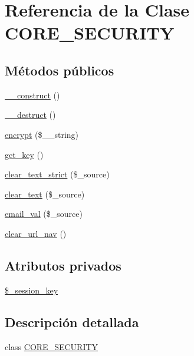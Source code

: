 \hypertarget{classCORE__SECURITY}{\section{Referencia de la Clase C\-O\-R\-E\-\_\-\-S\-E\-C\-U\-R\-I\-T\-Y}
\label{classCORE__SECURITY}
}
\subsection*{Métodos públicos}
\begin{DoxyCompactItemize}
\item 
\hyperlink{classCORE__SECURITY_a095c5d389db211932136b53f25f39685}{\-\_\-\-\_\-construct} ()
\item 
\hyperlink{classCORE__SECURITY_a421831a265621325e1fdd19aace0c758}{\-\_\-\-\_\-destruct} ()
\item 
\hyperlink{classCORE__SECURITY_a5260703d06813a9a9fc8e5dd95ada8ba}{encrypt} (\$\-\_\-\-\_\-string)
\item 
\hyperlink{classCORE__SECURITY_a0395526ae8329a45cfee884e817bcaf4}{get\-\_\-key} ()
\item 
\hyperlink{classCORE__SECURITY_a32f3868e35b4c69308f50424c1dec05f}{clear\-\_\-text\-\_\-strict} (\$\-\_\-source)
\item 
\hyperlink{classCORE__SECURITY_acedcf5bb123cedc39c507da2530af795}{clear\-\_\-text} (\$\-\_\-source)
\item 
\hyperlink{classCORE__SECURITY_ac36c94a68d7893be80e01fb117256af1}{email\-\_\-val} (\$\-\_\-source)
\item 
\hyperlink{classCORE__SECURITY_a92c19f2316b297b6cbc98520bf93e865}{clear\-\_\-url\-\_\-nav} ()
\end{DoxyCompactItemize}
\subsection*{Atributos privados}
\begin{DoxyCompactItemize}
\item 
\hyperlink{classCORE__SECURITY_a093ad82604ccd677f715e79ebe4b7b78}{\$\-\_\-session\-\_\-key}
\end{DoxyCompactItemize}


\subsection{Descripción detallada}
class \hyperlink{classCORE__SECURITY}{C\-O\-R\-E\-\_\-\-S\-E\-C\-U\-R\-I\-T\-Y} 

